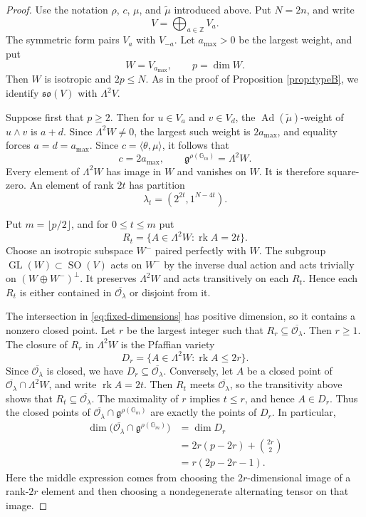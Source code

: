 \documentclass[12pt]{article}
\theoremstyle{remark}
\theoremstyle{plain}
\DeclareMathOperator{\rk}{rk}
\newcommand{\Gm}{\mathbb G_m}
\begin{document}
\begin{proof}
Use the notation $\rho$, $c$, $\mu$, and $\widetilde{\mu}$ introduced
above. Put $N=2n$, and write
\[
V=\bigoplus_{a\in\mathbb Z}V_a.
\]
The symmetric form pairs $V_a$ with $V_{-a}$. Let $a_{\max}>0$ be the
largest weight, and put
\[
W=V_{a_{\max}},\qquad p=\dim W.
\]
Then $W$ is isotropic and $2p\leq N$. As in the proof of Proposition
\ref{prop:typeB}, we identify $\mathfrak{so}(V)$ with $\Lambda^2V$.

Suppose first that $p\geq2$. Then
for $u\in V_a$ and $v\in V_d$, the
$\operatorname{Ad}(\widetilde\mu)$-weight of $u\wedge v$ is $a+d$.
Since $\Lambda^2W\ne0$, the largest such weight is
$2a_{\max}$, and equality forces $a=d=a_{\max}$.
Since $c=\langle\theta,\mu\rangle$, it follows that
\[
c=2a_{\max},
\qquad
\mathfrak g^{\rho(\Gm)}=\Lambda^2W.
\]
Every element of $\Lambda^2W$ has image in $W$ and vanishes on $W$.
It is therefore square-zero. An element of rank $2t$ has partition
\[
\lambda_t=(2^{2t},1^{N-4t}).
\]

Put $m=\lfloor p/2\rfloor$, and for $0\leq t\leq m$ put
\[
R_t=\{A\in\Lambda^2W:\rk A=2t\}.
\]
Choose an isotropic subspace $W^-$ paired perfectly with $W$.
The subgroup $\operatorname{GL}(W)\subset\operatorname{SO}(V)$ acts
on $W^-$ by the inverse dual action and acts trivially on
$(W\oplus W^-)^\perp$. It preserves $\Lambda^2W$ and acts
transitively on each $R_t$. Hence each $R_t$ is either contained in
$\overline{\mathcal O_\lambda}$ or disjoint from it.

The intersection in \eqref{eq:fixed-dimensions} has positive
dimension, so it contains a nonzero closed point. Let $r$ be the
largest integer such that
$R_r\subseteq\overline{\mathcal O_\lambda}$. Then $r\geq1$.
The closure of $R_r$ in $\Lambda^2W$ is the Pfaffian variety
\[
D_r=\{A\in\Lambda^2W:\rk A\leq2r\}.
\]
Since $\overline{\mathcal O_\lambda}$ is closed, we have
$D_r\subseteq\overline{\mathcal O_\lambda}$. Conversely, let
$A$ be a closed point of
$\overline{\mathcal O_\lambda}\cap\Lambda^2W$, and write
$\rk A=2t$. Then $R_t$ meets $\overline{\mathcal O_\lambda}$, so the
transitivity above shows that
$R_t\subseteq\overline{\mathcal O_\lambda}$. The maximality of $r$
implies $t\leq r$, and hence $A\in D_r$. Thus the closed points of
$\overline{\mathcal O_\lambda}\cap\mathfrak g^{\rho(\Gm)}$ are
exactly the points of $D_r$. In particular,
\[
\begin{aligned}
\dim\bigl(\overline{\mathcal O_\lambda}
\cap\mathfrak g^{\rho(\Gm)}\bigr)
&=\dim D_r\\
&=2r(p-2r)+\binom{2r}{2}\\
&=r(2p-2r-1).
\end{aligned}
\]
Here the middle expression comes from choosing the $2r$-dimensional
image of a rank-$2r$ element and then choosing a nondegenerate
alternating tensor on that image.


\end{proof}
\end{document}
